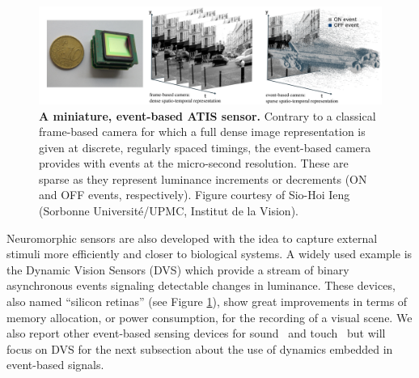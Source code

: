 \documentclass[brainsci, %
               review,submit,pdftex,moreauthors
               ]{Definitions/mdpi}
\begin{document}
%
\begin{figure}
\centering
\includegraphics[width=0.980\linewidth]{figures/event_driven_computations.png}
\caption{\textbf{A miniature, event-based ATIS sensor.} Contrary to a classical frame-based camera for which a full dense image representation is given at discrete, regularly spaced timings, the event-based camera provides with events at the micro-second resolution. These are sparse as they represent luminance increments or decrements (ON and OFF events, respectively). Figure courtesy of Sio-Hoi Ieng (Sorbonne Université/UPMC, Institut de la Vision).}\label{fig:silicon_retina}
\end{figure}
%
Neuromorphic sensors are also developed with the idea to capture external stimuli more efficiently and closer to biological systems. A widely used example is the Dynamic Vision Sensors (DVS) which provide a stream of binary asynchronous events signaling detectable changes in luminance. These devices, also named ``silicon retinas'' (see Figure \ref{fig:silicon_retina}), show great improvements in terms of memory allocation, or power consumption, for the recording of a visual scene. We also report other event-based sensing devices for sound~\citep{chan_aer_2007} and touch~\citep{haessig_event-based_2020} but will focus on DVS for the next subsection about the use of dynamics embedded in event-based signals. 

%
\end{document}
